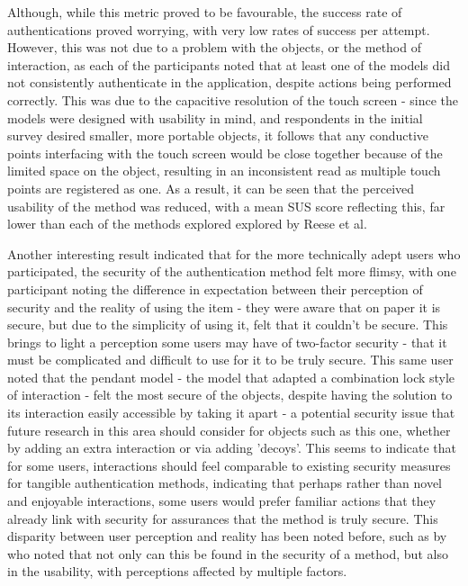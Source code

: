\documentclass{l4proj}
\begin{document}
Although, while this metric proved to be favourable, the success rate of authentications proved worrying, with very low rates of success per attempt. However, this was not due to a problem with the objects, or the method of interaction, as each of the participants noted that at least one of the models did not consistently authenticate in the application, despite actions being performed correctly. This was due to the capacitive resolution of the touch screen - since the models were designed with usability in mind, and respondents in the initial survey desired smaller, more portable objects, it follows that any conductive points interfacing with the touch screen would be close together because of the limited space on the object, resulting in an inconsistent read as multiple touch points are registered as one. As a result, it can be seen that the perceived usability of the method was reduced, with a mean SUS score reflecting this, far lower than each of the methods explored explored by Reese et al.

Another interesting result indicated that for the more technically adept users who participated, the security of the authentication method felt more flimsy, with one participant noting the difference in expectation between their perception of security and the reality of using the item - they were aware that on paper it is secure, but due to the simplicity of using it, felt that it couldn't be secure. This brings to light a perception some users may have of two-factor security - that it must be complicated and difficult to use for it to be truly secure. This same user noted that the pendant model - the model that adapted a combination lock style of interaction - felt the most secure of the objects, despite having the solution to its interaction easily accessible by taking it apart - a potential security issue that future research in this area should consider for objects such as this one, whether by adding an extra interaction or via adding 'decoys'. This seems to indicate that for some users, interactions should feel comparable to existing security measures for tangible authentication methods, indicating that perhaps rather than novel and enjoyable interactions, some users would prefer familiar actions that they already link with security for assurances that the method is truly secure. This disparity between user perception and reality has been noted before, such as by \cite{zimmermann2020password} who noted that not only can this be found in the security of a method, but also in the usability, with perceptions affected by multiple factors.
\end{document}
